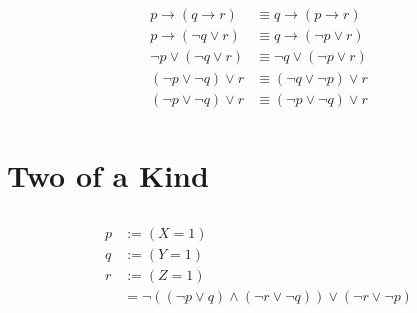 \documentclass[11pt]{article}
\begin{document}
\subsection{} %
\begin{align*}
	p \rightarrow (q \rightarrow r) &\equiv q \rightarrow (p \rightarrow r) \\
	p \rightarrow (\neg{q} \lor r) &\equiv q \rightarrow (\neg{p} \lor r) \tag*{Law of Implication x2}\\
	\neg{p} \lor (\neg{q} \lor r) &\equiv \neg{q} \lor (\neg{p} \lor r) \tag*{Law of Implication x2}\\
	(\neg{p} \lor \neg{q}) \lor r &\equiv (\neg{q} \lor \neg{p}) \lor r \tag*{Associativity}\\
	(\neg{p} \lor \neg{q}) \lor r &\equiv (\neg{p} \lor \neg{q}) \lor r \tag*{Commutativity}\\
\end{align*}

\section{Two of a Kind} %
\subsection{} %
\begin{align*}
	p &:= (X = 1) \\
	q &:= (Y = 1) \\
	r &:= (Z = 1) \\
	&= \neg{((\neg{p} \lor q) \land (\neg{r} \lor \neg{q}))} \lor (\neg{r} \lor \neg{p}) \\
\end{align*}
\end{document}
